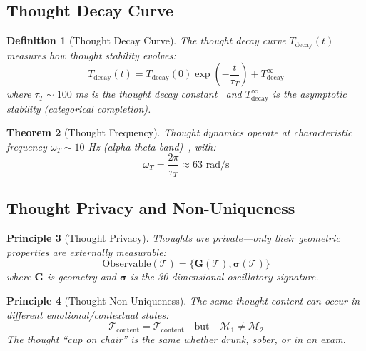 \documentclass[aps,prd,twocolumn,superscriptaddress,floatfix,nofootinbib]{revtex4-2}
\newtheorem{theorem}{Theorem}[section]
\newtheorem{definition}[theorem]{Definition}
\newtheorem{principle}[theorem]{Principle}
\theoremstyle{remark}
\newcommand{\Tcat}{\mathcal{T}}
\newcommand{\Tdecay}{T_{\mathrm{decay}}}
\newcommand{\Mstate}{\mathcal{M}}
\begin{document}
\subsection{Thought Decay Curve}

\begin{definition}[Thought Decay Curve]
\label{def:thought_decay}
The thought decay curve $\Tdecay(t)$ measures how thought stability evolves:
\begin{equation}
\Tdecay(t) = \Tdecay(0) \exp\left(-\frac{t}{\tau_T}\right) + \Tdecay^{\infty}
\end{equation}
where $\tau_T \sim 100$ ms is the thought decay constant~\cite{engel2001dynamic} and $\Tdecay^{\infty}$ is the asymptotic stability (categorical completion).
\end{definition}

\begin{theorem}[Thought Frequency]
\label{thm:thought_freq}
Thought dynamics operate at characteristic frequency $\omega_T \sim 10$ Hz (alpha-theta band)~\cite{buzsaki2006rhythms,buzsaki2004neuronal}, with:
\begin{equation}
\omega_T = \frac{2\pi}{\tau_T} \approx 63 \text{ rad/s}
\end{equation}
\end{theorem}

\subsection{Thought Privacy and Non-Uniqueness}

\begin{principle}[Thought Privacy]
\label{princ:privacy}
Thoughts are private---only their geometric properties are externally measurable:
\begin{equation}
\text{Observable}(\Tcat) = \{\mathbf{G}(\Tcat), \boldsymbol{\sigma}(\Tcat)\}
\end{equation}
where $\mathbf{G}$ is geometry and $\boldsymbol{\sigma}$ is the 30-dimensional oscillatory signature.
\end{principle}

\begin{principle}[Thought Non-Uniqueness]
\label{princ:nonunique}
The same thought content can occur in different emotional/contextual states:
\begin{equation}
\Tcat_{\text{content}} = \Tcat_{\text{content}} \quad \text{but} \quad \Mstate_1 \neq \Mstate_2
\end{equation}
The thought ``cup on chair'' is the same whether drunk, sober, or in an exam.
\end{principle}
\end{document}
